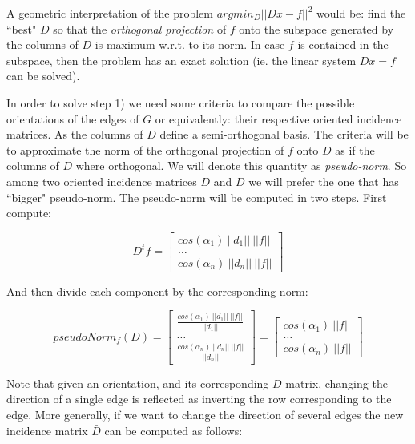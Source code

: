 \documentclass[a4paper,11pt]{article}
\begin{document}
\bigskip

A geometric interpretation of the problem $argmin_D||Dx-f||^2$ would be: 
find the ``best" $D$ so that the \textit{orthogonal projection} of $f$ 
onto the subspace generated by the columns of $D$ is 
maximum w.r.t. to its norm. In case $f$ is contained in the subspace, 
then the problem has an exact solution (ie. the linear system $Dx = f$ 
can be solved).

\bigskip

In order to solve step 1) we need some criteria to compare the possible 
orientations of the edges of $G$ or equivalently: their respective 
oriented incidence matrices. As the columns of $D$ define a 
semi-orthogonal basis. The criteria will be to approximate the norm 
of the orthogonal projection of $f$ onto $D$ as if the columns of $D$ 
where orthogonal. We will denote this quantity as \textit{pseudo-norm}.
 So among two oriented incidence matrices $D$ and $\bar{D}$ we will 
prefer the one that has ``bigger" pseudo-norm. The pseudo-norm will be 
computed in two steps. First compute:

$$
D^t f = \begin{bmatrix}
	cos(\alpha_1) \ ||d_1|| \ ||f||\\
	\dots \\
	cos(\alpha_n) \ ||d_n|| \ ||f||
\end{bmatrix}
$$

\bigskip

And then divide each component by the corresponding norm:

$$
pseudoNorm_f(D) = \begin{bmatrix}
	\frac{cos(\alpha_1) \ ||d_1|| \ ||f||}{||d_1||}\\
	\dots \\
	\frac{cos(\alpha_n) \ ||d_n|| \ ||f||}{||d_n||}
\end{bmatrix} = \begin{bmatrix}
	cos(\alpha_1) \ ||f||\\
	\dots \\
	cos(\alpha_n) \ ||f||
\end{bmatrix}
$$

\bigskip


Note that given an orientation, and its 
corresponding $D$ matrix, changing the direction of a single edge is 
reflected as inverting the row corresponding to the edge. More generally, 
if we want to change the direction of several edges the new incidence 
matrix $\bar{D}$ can be computed as follows:
\end{document}
